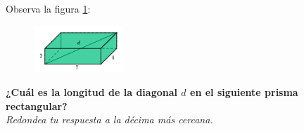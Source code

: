 \question[20] Observa la figura \ref{fig:pitagoras3D_diag_02}:
\begin{figure}[H]
    \begin{center}
        \includegraphics[width=0.3\textwidth]{../images/pitagoras3D_diag_02.png}
    \end{center}
    \caption{}
    \label{fig:pitagoras3D_diag_02}
\end{figure}
\textbf{¿Cuál es la longitud de la diagonal $d$ en el siguiente prisma rectangular?}\\
\textit{Redondea tu respuesta a la décima más cercana.}